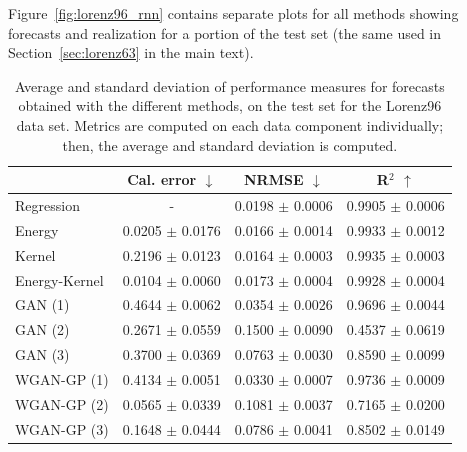 \documentclass[twoside,11pt]{article}
\begin{document}
	
	Figure~\ref{fig:lorenz96_rnn} contains separate plots for all methods showing forecasts and realization for a portion of the test set (the same used in Section~\ref{sec:lorenz63} in the main text).
	
	
	\begin{table}[tb]
		\begin{center}
			\begin{tabular}{lccc}
				\toprule
				& Cal. error $ \downarrow $ & NRMSE $ \downarrow $ & R$ ^2 $ $ \uparrow $ \\
				\midrule
				Regression & - & 0.0198  $ \pm$ 0.0006 &  0.9905 $ \pm$ 0.0006  \\
				Energy & 0.0205 $ \pm$ 0.0176 & 0.0166  $ \pm$ 0.0014 &  0.9933 $ \pm$ 0.0012   \\
				Kernel & 0.2196 $ \pm$ 0.0123 & 0.0164  $ \pm$ 0.0003 &  0.9935 $ \pm$ 0.0003  \\
				Energy-Kernel & 0.0104 $ \pm$ 0.0060 & 0.0173  $ \pm$ 0.0004 &  0.9928 $ \pm$ 0.0004  \\
				GAN (1) & 0.4644 $ \pm$ 0.0062 & 0.0354  $ \pm$ 0.0026 &  0.9696 $ \pm$ 0.0044  \\
				GAN (2) & 0.2671 $ \pm$ 0.0559 & 0.1500  $ \pm$ 0.0090 &  0.4537 $ \pm$ 0.0619   \\
				GAN (3) & 0.3700 $ \pm$ 0.0369 & 0.0763  $ \pm$ 0.0030 &  0.8590 $ \pm$ 0.0099 \\
				WGAN-GP (1) & 0.4134 $ \pm$ 0.0051 & 0.0330  $ \pm$ 0.0007 &  0.9736 $ \pm$ 0.0009 \\
				WGAN-GP (2) & 0.0565 $ \pm$ 0.0339 & 0.1081  $ \pm$ 0.0037 &  0.7165 $ \pm$ 0.0200\\ 
				WGAN-GP (3) & 0.1648 $ \pm$ 0.0444 & 0.0786  $ \pm$ 0.0041 &  0.8502 $ \pm$ 0.0149 \\ 
				\bottomrule
			\end{tabular}
		\end{center}
		\caption{Average and standard deviation of performance measures for forecasts obtained with the different methods, on the test set for the Lorenz96 data set. Metrics are computed on each data component individually; then, the average and standard deviation is computed.}	\label{tab:res_lorez96_rnn}
	\end{table}
	
\end{document}
